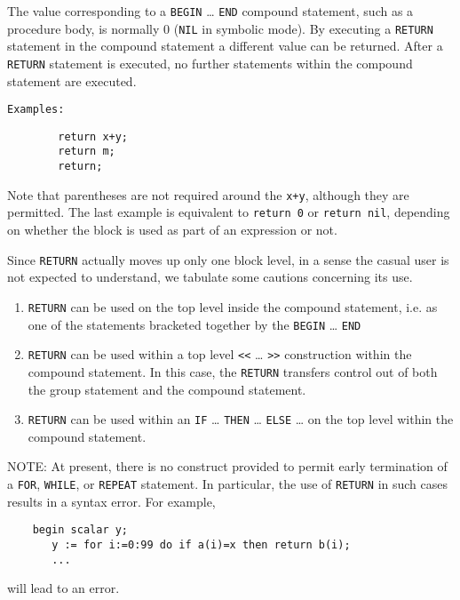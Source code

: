 The value corresponding to a \texttt{BEGIN} \ldots{} \texttt{END} compound
statement,
 such as a procedure body, is normally 0
(\texttt{NIL} in symbolic mode).  By executing a \texttt{RETURN}
statement in the compound statement a different value can be returned.
After a \texttt{RETURN} statement is executed, no further statements within
the compound statement are executed.

\texttt{Examples:}
\begin{verbatim}
        return x+y;
        return m;
        return;
\end{verbatim}
Note that parentheses are not required around the \texttt{x+y}, although they
are permitted.  The last example is equivalent to \texttt{return 0} or
\texttt{return nil}, depending on whether the block is used as part of an
expression or not.

Since \texttt{RETURN} actually moves up only one
block level, in a sense the casual user is not expected to
understand, we tabulate some cautions concerning its use.
\begin{enumerate}
\item \texttt{RETURN} can be used on the top level inside the compound
statement, i.e. as one of the statements bracketed together by the
\texttt{BEGIN} \ldots{} \texttt{END}

\item \texttt{RETURN} can be used within a top level \texttt{<}\texttt{<}
  \ldots{} \texttt{>}\texttt{>} construction within the compound statement. In
  this case, the \texttt{RETURN} transfers control out of both the
  group statement and the compound statement.

\item \texttt{RETURN} can be used within an \texttt{IF} \ldots{}
  \texttt{THEN} \ldots{} \texttt{ELSE} \ldots{} on the top level within
  the compound statement.
\end{enumerate}
NOTE:  At present, there is no construct provided to permit early
termination of a \texttt{FOR}, \texttt{WHILE},
or \texttt{REPEAT} statement.  In particular, the use of
\texttt{RETURN} in such cases results in a syntax error.  For example,
\begin{verbatim}
    begin scalar y;
       y := for i:=0:99 do if a(i)=x then return b(i);
       ...
\end{verbatim}
will lead to an error.

